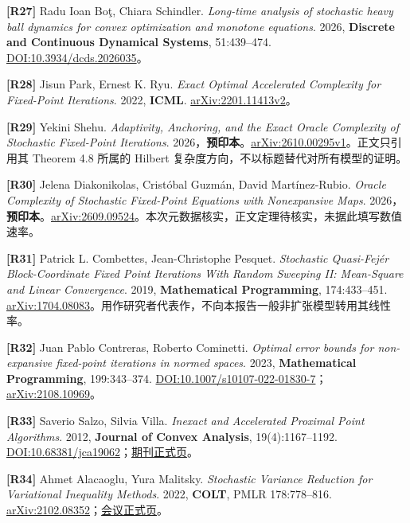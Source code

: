 \documentclass[
  chinese,
  10pt,
  a4paper,
]{article}
\begin{document}
\textbf{{[}R27{]}} Radu Ioan Boţ, Chiara Schindler. \emph{Long-time
analysis of stochastic heavy ball dynamics for convex optimization and
monotone equations}. 2026, \textbf{Discrete and Continuous Dynamical
Systems}, 51:439--474.
\href{https://doi.org/10.3934/dcds.2026035}{DOI:10.3934/dcds.2026035}。

\textbf{{[}R28{]}} Jisun Park, Ernest K. Ryu. \emph{Exact Optimal
Accelerated Complexity for Fixed-Point Iterations}. 2022, \textbf{ICML}.
\href{https://arxiv.org/abs/2201.11413v2}{arXiv:2201.11413v2}。

\textbf{{[}R29{]}} Yekini Shehu. \emph{Adaptivity, Anchoring, and the
Exact Oracle Complexity of Stochastic Fixed-Point Iterations}.
2026，\textbf{预印本}。\href{https://arxiv.org/abs/2610.00295v1}{arXiv:2610.00295v1}。正文只引用其
Theorem 4.8 所属的 Hilbert 复杂度方向，不以标题替代对所有模型的证明。

\textbf{{[}R30{]}} Jelena Diakonikolas, Cristóbal Guzmán, David
Martínez-Rubio. \emph{Oracle Complexity of Stochastic Fixed-Point
Equations with Nonexpansive Maps}.
2026，\textbf{预印本}。\href{https://arxiv.org/abs/2609.09524}{arXiv:2609.09524}。本次元数据核实，正文定理待核实，未据此填写数值速率。

\textbf{{[}R31{]}} Patrick L. Combettes, Jean-Christophe Pesquet.
\emph{Stochastic Quasi-Fejér Block-Coordinate Fixed Point Iterations
With Random Sweeping II: Mean-Square and Linear Convergence}. 2019,
\textbf{Mathematical Programming}, 174:433--451.
\href{https://arxiv.org/abs/1704.08083}{arXiv:1704.08083}。用作研究者代表作，不向本报告一般非扩张模型转用其线性率。

\textbf{{[}R32{]}} Juan Pablo Contreras, Roberto Cominetti.
\emph{Optimal error bounds for non-expansive fixed-point iterations in
normed spaces}. 2023, \textbf{Mathematical Programming}, 199:343--374.
\href{https://doi.org/10.1007/s10107-022-01830-7}{DOI:10.1007/s10107-022-01830-7}；\href{https://arxiv.org/abs/2108.10969}{arXiv:2108.10969}。

\textbf{{[}R33{]}} Saverio Salzo, Silvia Villa. \emph{Inexact and
Accelerated Proximal Point Algorithms}. 2012, \textbf{Journal of Convex
Analysis}, 19(4):1167--1192.
\href{https://doi.org/10.68381/jca19062}{DOI:10.68381/jca19062}；\href{https://journalofconvexanalysis.com/articles/jca19062/}{期刊正式页}。

\textbf{{[}R34{]}} Ahmet Alacaoglu, Yura Malitsky. \emph{Stochastic
Variance Reduction for Variational Inequality Methods}. 2022,
\textbf{COLT}, PMLR 178:778--816.
\href{https://arxiv.org/abs/2102.08352}{arXiv:2102.08352}；\href{https://proceedings.mlr.press/v178/alacaoglu22a.html}{会议正式页}。
\end{document}
